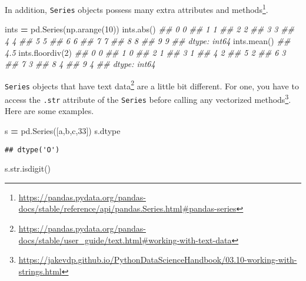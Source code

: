 \documentclass[
  12pt,
  krantz2]{krantz}
\makeatletter
\newenvironment{Shaded}{\begin{snugshade}}{\end{snugshade}}
\newcommand{\BuiltInTok}[1]{#1}
\newcommand{\CommentTok}[1]{\textcolor[rgb]{0.37,0.37,0.37}{\textit{#1}}}
\newcommand{\DecValTok}[1]{\textcolor[rgb]{0.06,0.06,0.06}{#1}}
\newcommand{\NormalTok}[1]{#1}
\newcommand{\OperatorTok}[1]{\textcolor[rgb]{0.43,0.43,0.43}{\textbf{#1}}}
\newcommand{\StringTok}[1]{\textcolor[rgb]{0.5,0.5,0.5}{#1}}
\renewcommand{\href}[2]{#2\footnote{\url{#1}}}
\newenvironment{kframe}{%
\medskip{}
\setlength{\fboxsep}{.8em}
 \def\at@end@of@kframe{}%
 \ifinner\ifhmode%
  \def\at@end@of@kframe{\end{minipage}}%
  \begin{minipage}{\columnwidth}%
 \fi\fi%
 \def\FrameCommand##1{\hskip\@totalleftmargin \hskip-\fboxsep
 \colorbox{shadecolor}{##1}\hskip-\fboxsep
     \hskip-\linewidth \hskip-\@totalleftmargin \hskip\columnwidth}%
 \MakeFramed {\advance\hsize-\width
   \@totalleftmargin\z@ \linewidth\hsize
   \@setminipage}}%
 {\par\unskip\endMakeFramed%
 \at@end@of@kframe}
\renewenvironment{Shaded}{\begin{kframe}}{\end{kframe}}
\makeatother
\begin{document}
In addition, \texttt{Series} objects possess many extra \href{https://pandas.pydata.org/pandas-docs/stable/reference/api/pandas.Series.html\#pandas-series}{attributes and methods}.

\begin{Shaded}
\begin{Highlighting}[]
\NormalTok{ints }\OperatorTok{=}\NormalTok{ pd.Series(np.arange(}\DecValTok{10}\NormalTok{))}
\NormalTok{ints.}\BuiltInTok{abs}\NormalTok{()}
\CommentTok{\#\# 0    0}
\CommentTok{\#\# 1    1}
\CommentTok{\#\# 2    2}
\CommentTok{\#\# 3    3}
\CommentTok{\#\# 4    4}
\CommentTok{\#\# 5    5}
\CommentTok{\#\# 6    6}
\CommentTok{\#\# 7    7}
\CommentTok{\#\# 8    8}
\CommentTok{\#\# 9    9}
\CommentTok{\#\# dtype: int64}
\NormalTok{ints.mean()}
\CommentTok{\#\# 4.5}
\NormalTok{ints.floordiv(}\DecValTok{2}\NormalTok{)}
\CommentTok{\#\# 0    0}
\CommentTok{\#\# 1    0}
\CommentTok{\#\# 2    1}
\CommentTok{\#\# 3    1}
\CommentTok{\#\# 4    2}
\CommentTok{\#\# 5    2}
\CommentTok{\#\# 6    3}
\CommentTok{\#\# 7    3}
\CommentTok{\#\# 8    4}
\CommentTok{\#\# 9    4}
\CommentTok{\#\# dtype: int64}
\end{Highlighting}
\end{Shaded}

\texttt{Series} objects that have \href{https://pandas.pydata.org/pandas-docs/stable/user_guide/text.html\#working-with-text-data}{text data} are a little bit different. For one, you have to access the \texttt{.str} attribute of the \texttt{Series} before calling any \href{https://jakevdp.github.io/PythonDataScienceHandbook/03.10-working-with-strings.html}{vectorized methods}. Here are some examples.

\begin{Shaded}
\begin{Highlighting}[]
\NormalTok{s }\OperatorTok{=}\NormalTok{ pd.Series([}\StringTok{\textquotesingle{}a\textquotesingle{}}\NormalTok{,}\StringTok{\textquotesingle{}b\textquotesingle{}}\NormalTok{,}\StringTok{\textquotesingle{}c\textquotesingle{}}\NormalTok{,}\StringTok{\textquotesingle{}33\textquotesingle{}}\NormalTok{])}
\NormalTok{s.dtype}
\end{Highlighting}
\end{Shaded}

\begin{verbatim}
## dtype('O')
\end{verbatim}

\begin{Shaded}
\begin{Highlighting}[]
\NormalTok{s.}\BuiltInTok{str}\NormalTok{.isdigit()}
\end{Highlighting}
\end{Shaded}
\end{document}
